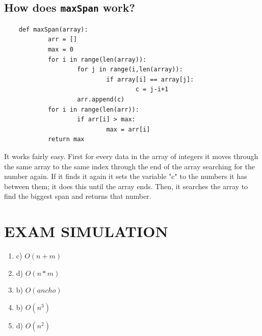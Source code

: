 \documentclass[a4paper,12pt]{article}
\begin{document}
  \subsection{How does \texttt{maxSpan} work?}
  \begin{Verbatim}
    def maxSpan(array):
            arr = []
            max = 0
            for i in range(len(array)):
                    for j in range(i,len(array)):
                            if array[i] == array[j]:
                                    c = j-i+1
                    arr.append(c)
            for i in range(len(arr)):
                    if arr[i] > max:
                            max = arr[i]
            return max
  \end{Verbatim}
It works fairly easy. First for every data in the array of integers it moves
through the same array to the same index through the end of the array
searching for the number again. If it finds it again it sets the variable "c"
to the numbers it has between them; it does this until the array ends. Then,
it searches the array to find the biggest span and returns that number.

  \section{EXAM SIMULATION}
  \begin{enumerate}
    \item c) $O(n+m)$
    \item d) $O(n*m)$
    \item b) $O(ancho)$
    \item b) $O(n^3)$
    \item d) $O(n^2)$
  \end{enumerate}


    \newpage
    
    
\end{document}
